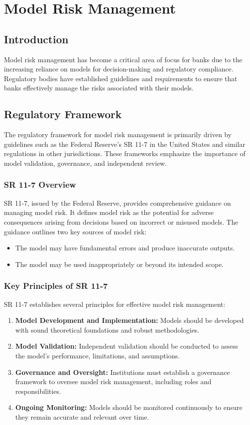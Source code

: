 \section{Model Risk Management}
\label{sec:modelrisk}

\subsection{Introduction}
Model risk management has become a critical area of focus for banks due to the increasing reliance on models for decision-making and regulatory compliance. Regulatory bodies have established guidelines and requirements to ensure that banks effectively manage the risks associated with their models.

\subsection{Regulatory Framework}
The regulatory framework for model risk management is primarily driven by guidelines such as the Federal Reserve's SR 11-7 in the United States and similar regulations in other jurisdictions. These frameworks emphasize the importance of model validation, governance, and independent review.

\subsubsection{SR 11-7 Overview}
SR 11-7, issued by the Federal Reserve, provides comprehensive guidance on managing model risk. It defines model risk as the potential for adverse consequences arising from decisions based on incorrect or misused models. The guidance outlines two key sources of model risk:
\begin{itemize}
    \item The model may have fundamental errors and produce inaccurate outputs.
    \item The model may be used inappropriately or beyond its intended scope.
\end{itemize}

\subsubsection{Key Principles of SR 11-7}
SR 11-7 establishes several principles for effective model risk management:
\begin{enumerate}
    \item \textbf{Model Development and Implementation:} Models should be developed with sound theoretical foundations and robust methodologies.
    \item \textbf{Model Validation:} Independent validation should be conducted to assess the model's performance, limitations, and assumptions.
    \item \textbf{Governance and Oversight:} Institutions must establish a governance framework to oversee model risk management, including roles and responsibilities.
    \item \textbf{Ongoing Monitoring:} Models should be monitored continuously to ensure they remain accurate and relevant over time.
\end{enumerate}


